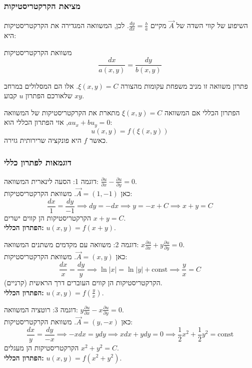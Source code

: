 \subsubsection{מציאת הקרקטריסטיקות}
השיפוע של קווי השדה של $\vec{A}$ מקיים $\frac{dy}{dx} = \frac{b}{a}$. לכן, המשוואה המגדירה את הקרקטריסטיקות היא:
\begin{formulabox}{משוואת הקרקטריסטיקות}
\[ \frac{dx}{a(x,y)} = \frac{dy}{b(x,y)} \]
\end{formulabox}
פתרון משוואה זו מניב משפחת עקומות מהצורה $\xi(x,y) = C$. אלו הם המסלולים במרחב $xy$ שלאורכם הפתרון $u$ קבוע.

\begin{theorembox}{הפתרון הכללי}
אם המשוואה $\xi(x,y) = C$ מתארת את הקרקטריסטיקות של המשוואה $a u_x + b u_y = 0$, אזי הפתרון הכללי הוא:
\[ u(x,y) = f(\xi(x,y)) \]
כאשר $f$ היא פונקציה שרירותית גזירה.
\end{theorembox}

\subsubsection{דוגמאות לפתרון כללי}

\begin{examplebox}{דוגמה 1: הסעה לינארית}
המשוואה: $\frac{\partial u}{\partial x} - \frac{\partial u}{\partial y} = 0$.
\\
כאן $\vec{A} = (1, -1)$. משוואת הקרקטריסטיקות:
\[ \frac{dx}{1} = \frac{dy}{-1} \implies dy = -dx \implies y = -x + C \implies x + y = C \]
הקרקטריסטיקות הן קווים ישרים $x+y=C$.
\\
\textbf{הפתרון הכללי:} $u(x,y) = f(x+y)$.
\end{examplebox}

\begin{examplebox}{דוגמה 2: משוואה עם מקדמים משתנים}
המשוואה: $x \frac{\partial u}{\partial x} + y \frac{\partial u}{\partial y} = 0$.
\\
כאן $\vec{A} = (x, y)$. משוואת הקרקטריסטיקות:
\[ \frac{dx}{x} = \frac{dy}{y} \implies \ln|x| = \ln|y| + \text{const} \implies \frac{y}{x} = C \]
הקרקטריסטיקות הן קווים העוברים דרך הראשית (קרניים).
\\
\textbf{הפתרון הכללי:} $u(x,y) = f\left(\frac{y}{x}\right)$.
\end{examplebox}

\begin{examplebox}{דוגמה 3: רוטציה}
המשוואה: $y \frac{\partial u}{\partial x} - x \frac{\partial u}{\partial y} = 0$.
\\
כאן $\vec{A} = (y, -x)$. משוואת הקרקטריסטיקות:
\[ \frac{dx}{y} = \frac{dy}{-x} \implies -x dx = y dy \implies x dx + y dy = 0 \implies \frac{1}{2}x^2 + \frac{1}{2}y^2 = \text{const} \]
הקרקטריסטיקות הן מעגלים $x^2 + y^2 = C$.
\\
\textbf{הפתרון הכללי:} $u(x,y) = f(x^2 + y^2)$.
\end{examplebox}


